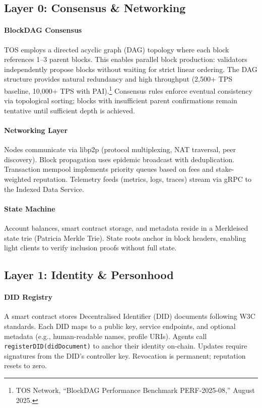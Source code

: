 \documentclass[11pt]{article}
\begin{document}
\subsection{Layer 0: Consensus \& Networking}
\paragraph{BlockDAG Consensus} TOS employs a directed acyclic graph (DAG) topology where each block references 1--3 parent blocks. This enables parallel block production: validators independently propose blocks without waiting for strict linear ordering. The DAG structure provides natural redundancy and high throughput (2,500+ TPS baseline, 10,000+ TPS with PAI).\footnote{TOS Network, ``BlockDAG Performance Benchmark PERF-2025-08,'' August 2025.} Consensus rules enforce eventual consistency via topological sorting; blocks with insufficient parent confirmations remain tentative until sufficient depth is achieved.

\paragraph{Networking Layer} Nodes communicate via libp2p (protocol multiplexing, NAT traversal, peer discovery). Block propagation uses epidemic broadcast with deduplication. Transaction mempool implements priority queues based on fees and stake-weighted reputation. Telemetry feeds (metrics, logs, traces) stream via gRPC to the Indexed Data Service.

\paragraph{State Machine} Account balances, smart contract storage, and metadata reside in a Merkleised state trie (Patricia Merkle Trie). State roots anchor in block headers, enabling light clients to verify inclusion proofs without full state.

\subsection{Layer 1: Identity \& Personhood}
\paragraph{DID Registry} A smart contract stores Decentralised Identifier (DID) documents following W3C standards. Each DID maps to a public key, service endpoints, and optional metadata (e.g., human-readable names, profile URIs). Agents call \texttt{registerDID(didDocument)} to anchor their identity on-chain. Updates require signatures from the DID's controller key. Revocation is permanent; reputation resets to zero.
\end{document}
